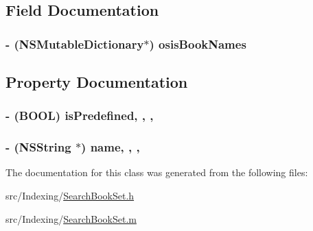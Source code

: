 \subsection{Field Documentation}
\hypertarget{interface_search_book_set_a0c8f91395667336825fcaa94c4dd1140}{
\subsubsection[{osis\-Book\-Names}]{\setlength{\rightskip}{0pt plus 5cm}-\/ (N\-S\-Mutable\-Dictionary$\ast$) osis\-Book\-Names\hspace{0.3cm}{\ttfamily [protected]}}}\label{interface_search_book_set_a0c8f91395667336825fcaa94c4dd1140}


\subsection{Property Documentation}
\hypertarget{interface_search_book_set_acb3f0b5da5aa8d9216cd913347d2452c}{
\subsubsection[{is\-Predefined}]{\setlength{\rightskip}{0pt plus 5cm}-\/ (B\-O\-O\-L) is\-Predefined\hspace{0.3cm}{\ttfamily [read]}, {\ttfamily [write]}, {\ttfamily [atomic]}, {\ttfamily [assign]}}}\label{interface_search_book_set_acb3f0b5da5aa8d9216cd913347d2452c}
\hypertarget{interface_search_book_set_afc8ccc6676addc3b49a494b2bf969c68}{
\subsubsection[{name}]{\setlength{\rightskip}{0pt plus 5cm}-\/ (N\-S\-String $\ast$) name\hspace{0.3cm}{\ttfamily [read]}, {\ttfamily [write]}, {\ttfamily [atomic]}, {\ttfamily [retain]}}}\label{interface_search_book_set_afc8ccc6676addc3b49a494b2bf969c68}


The documentation for this class was generated from the following files\-:\begin{DoxyCompactItemize}
\item 
src/\-Indexing/\hyperlink{_search_book_set_8h}{Search\-Book\-Set.\-h}\item 
src/\-Indexing/\hyperlink{_search_book_set_8m}{Search\-Book\-Set.\-m}\end{DoxyCompactItemize}
